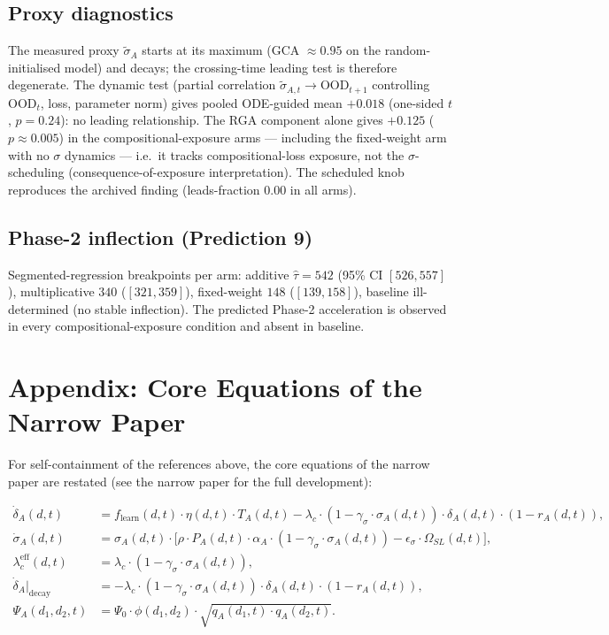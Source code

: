 \documentclass[11pt]{article}
\theoremstyle{definition}
\theoremstyle{plain}
\begin{document}
\subsection{Proxy diagnostics}

The measured proxy $\tilde{\sigma}_A$ starts at its maximum (GCA
$\approx 0.95$ on the random-initialised model) and decays; the
crossing-time leading test is therefore degenerate. The dynamic test
(partial correlation $\tilde{\sigma}_{A,t} \to \text{OOD}_{t+1}$
controlling OOD$_t$, loss, parameter norm) gives pooled ODE-guided mean
$+0.018$ (one-sided $t$, $p = 0.24$): no leading relationship. The RGA
component alone gives $+0.125$ ($p \approx 0.005$) in the
compositional-exposure arms --- including the fixed-weight arm with no
$\sigma$ dynamics --- i.e.\ it tracks compositional-loss exposure, not
the $\sigma$-scheduling (consequence-of-exposure interpretation). The
scheduled knob reproduces the archived finding (leads-fraction $0.00$
in all arms).

\subsection{Phase-2 inflection (Prediction 9)}

Segmented-regression breakpoints per arm: additive $\hat{\tau} = 542$
(95\% CI $[526, 557]$), multiplicative $340$ ($[321, 359]$),
fixed-weight $148$ ($[139, 158]$), baseline ill-determined (no stable
inflection). The predicted Phase-2 acceleration is observed in every
compositional-exposure condition and absent in baseline.



\clearpage
\section*{Appendix: Core Equations of the Narrow Paper}\label{app:core}

For self-containment of the references above, the core equations of the
narrow paper are restated (see the narrow paper for the full development):

\begin{align}
\label{eq:depth-ode}
\dot{\delta}_A(d,t) &= f_{\text{learn}}(d,t) \cdot \eta(d,t) \cdot T_A(d,t) - \lambda_c \cdot (1 - \gamma_\sigma \cdot \sigma_A(d,t)) \cdot \delta_A(d,t) \cdot (1 - r_A(d,t)), \\
\label{eq:sigma-ode-r}
\dot{\sigma}_A(d,t) &= \sigma_A(d,t) \cdot \bigl[ \rho \cdot P_A(d,t) \cdot \alpha_A \cdot (1 - \gamma_{\sigma} \cdot \sigma_A(d,t)) - \epsilon_{\sigma} \cdot \Omega_{SL}(d,t) \bigr], \\
\label{eq:effective-decay}
\lambda_c^{\text{eff}}(d,t) &= \lambda_c \cdot (1 - \gamma_\sigma \cdot \sigma_A(d,t)), \\
\label{eq:depth-decay}
\dot{\delta}_A\big|_{\text{decay}} &= -\lambda_c \cdot (1 - \gamma_\sigma \cdot \sigma_A(d,t)) \cdot \delta_A(d,t) \cdot (1 - r_A(d,t)), \\
\label{eq:discovery-rate}
\Psi_A(d_1,d_2,t) &= \Psi_0 \cdot \phi(d_1,d_2) \cdot \sqrt{q_A(d_1,t) \cdot q_A(d_2,t)}.
\end{align}
\end{document}
